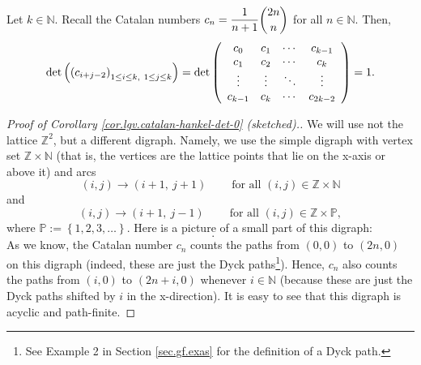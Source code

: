 \begin{corollary}
\label{cor.lgv.catalan-hankel-det-0}Let $k\in\mathbb{N}$. Recall the Catalan
numbers $c_{n}=\dfrac{1}{n+1}\dbinom{2n}{n}$ for all $n\in\mathbb{N}$. Then,%
\[
\det\left(  \left(  c_{i+j-2}\right)  _{1\leq i\leq k,\ 1\leq j\leq k}\right)
=\det\left(
\begin{array}
[c]{cccc}%
c_{0} & c_{1} & \cdots & c_{k-1}\\
c_{1} & c_{2} & \cdots & c_{k}\\
\vdots & \vdots & \ddots & \vdots\\
c_{k-1} & c_{k} & \cdots & c_{2k-2}%
\end{array}
\right)  =1.
\]

\end{corollary}

\begin{proof}
[Proof of Corollary \ref{cor.lgv.catalan-hankel-det-0} (sketched).]We will use
not the lattice $\mathbb{Z}^{2}$, but a different digraph. Namely, we use the
simple digraph with vertex set $\mathbb{Z}\times\mathbb{N}$ (that is, the
vertices are the lattice points that lie on the x-axis or above it) and arcs%
\[
\left(  i,j\right)  \rightarrow\left(  i+1,\ j+1\right)
\ \ \ \ \ \ \ \ \ \ \text{for all }\left(  i,j\right)  \in\mathbb{Z}%
\times\mathbb{N}%
\]
and%
\[
\left(  i,j\right)  \rightarrow\left(  i+1,\ j-1\right)
\ \ \ \ \ \ \ \ \ \ \text{for all }\left(  i,j\right)  \in\mathbb{Z}%
\times\mathbb{P},
\]
where $\mathbb{P}:=\left\{  1,2,3,\ldots\right\}  $. Here is a picture of a
small part of this digraph:%
\[%
\ \ .
\]
As we know, the Catalan number $c_{n}$ counts the paths from $\left(
0,0\right)  $ to $\left(  2n,0\right)  $ on this digraph (indeed, these are
just the Dyck paths\footnote{See Example 2 in Section \ref{sec.gf.exas} for
the definition of a Dyck path.}). Hence, $c_{n}$ also counts the paths from
$\left(  i,0\right)  $ to $\left(  2n+i,0\right)  $ whenever $i\in\mathbb{N}$
(because these are just the Dyck paths shifted by $i$ in the x-direction). It
is easy to see that this digraph is acyclic and path-finite.


\end{proof}
